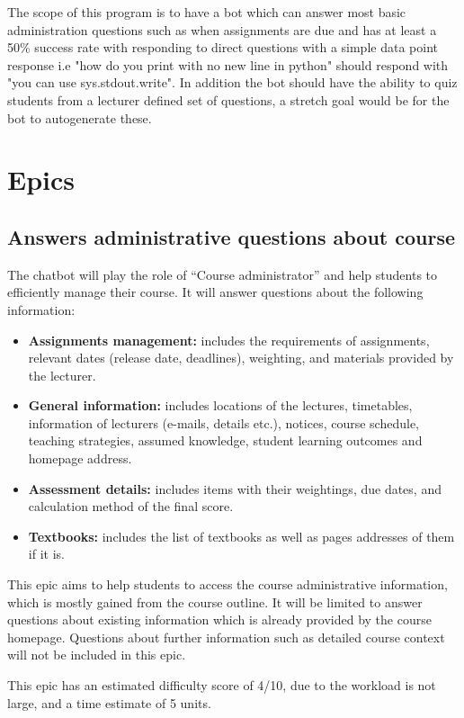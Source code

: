 \documentclass{article}
\begin{document}
The scope of this program is to have a bot which can answer most basic administration questions such as when assignments are due and has at least a 50\% success rate with responding to direct questions with a simple data point response i.e "how do you print with no new line in python" should respond with "you can use sys.stdout.write". In addition the bot should have the ability to quiz students from a lecturer defined set of questions, a stretch goal would be for the bot to autogenerate these.


\section{Epics}

\subsection{Answers administrative questions about course}

The chatbot will play the role of “Course administrator” and help students to efficiently manage their course. It will answer questions about the following information:
\begin{itemize}
  \item \textbf{Assignments management:} includes the requirements of assignments, relevant dates (release date, deadlines), weighting, and materials provided by the lecturer.
  \item \textbf{General information:} includes locations of the lectures, timetables, information of lecturers (e-mails, details etc.), notices, course schedule, teaching strategies, assumed knowledge, student learning outcomes and homepage address.
  \item \textbf{Assessment details:} includes items with their weightings, due dates, and calculation method of the final score.
  \item \textbf{Textbooks:} includes the list of textbooks as well as pages addresses of them if it is.
\end{itemize}

This epic aims to help students to access the course administrative information, which is mostly gained from the course outline. It will be limited to answer questions about existing information which is already provided by the course homepage. Questions about further information such as detailed course context will not be included in this epic.

This epic has an estimated difficulty score of 4/10, due to the workload is not large, and a time estimate of 5 units.
\end{document}
